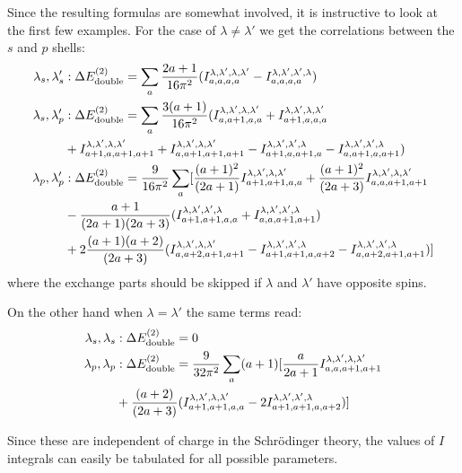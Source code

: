 Since the resulting formulas are somewhat involved, it is instructive to look at the first few examples. For the case of $\lambda\neq\lambda'$ we get the correlations between the $s$ and $p$ shells:
\begin{align}
    \lambda_s,\lambda'_s &: \Delta E^{(2)}_{\rm{double}}= \sum_a \frac{2a+1}{16 \pi^2} (I^{\lambda,\lambda',\lambda,\lambda'}_{a,a,a,a} - I^{\lambda,\lambda',\lambda',\lambda}_{a,a,a,a}) \\
    \lambda_s,\lambda'_p &:\Delta E^{(2)}_{\rm{double}}= \sum_a \frac{3(a+1)}{16 \pi^2} (I^{\lambda,\lambda',\lambda,\lambda'}_{a,a+1,a,a}+I^{\lambda,\lambda',\lambda,\lambda'}_{a+1,a,a,a} \\
    &+ I^{\lambda,\lambda',\lambda,\lambda'}_{a+1,a,a+1,a+1}+I^{\lambda,\lambda',\lambda,\lambda'}_{a,a+1,a+1,a+1}-I^{\lambda,\lambda',\lambda',\lambda}_{a+1,a,a+1,a}-I^{\lambda,\lambda',\lambda',\lambda}_{a,a+1,a,a+1}) \\
  \lambda_p,\lambda'_p &:\Delta E^{(2)}_{\rm{double}}= \frac{9}{16\pi^2}\sum_a [\frac{(a+1)^2}{(2a+1)}I^{\lambda,\lambda',\lambda,\lambda'}_{a+1,a+1,a,a} +\frac{(a+1)^2}{(2a+3)}I^{\lambda,\lambda',\lambda,\lambda'}_{a,a,a+1,a+1} \\
  &-\frac{a+1}{(2a+1)(2a+3)}(I^{\lambda,\lambda',\lambda',\lambda}_{a+1,a+1,a,a} +I^{\lambda,\lambda',\lambda',\lambda}_{a,a,a+1,a+1}) \\
 &+2 \frac{(a+1)(a+2)}{(2a+3)}(I^{\lambda,\lambda',\lambda,\lambda'}_{a,a+2,a+1,a+1}-I^{\lambda,\lambda',\lambda',\lambda}_{a+1,a+1,a,a+2} -I^{\lambda,\lambda',\lambda',\lambda}_{a,a+2,a+1,a+1})]
\end{align}
where the exchange parts should be skipped if $\lambda$ and $\lambda'$ have opposite spins.

On the other hand when $\lambda=\lambda'$ the same terms read:
\begin{align}
    \lambda_s,\lambda_s &: \Delta E^{(2)}_{\rm{double}}= 0 \\
  \lambda_p,\lambda_p &: \Delta E^{(2)}_{\rm{double}}= \frac{9}{32\pi^2}\sum_a (a+1)[\frac{a}{2a+1}I^{\lambda,\lambda',\lambda,\lambda'}_{a,a,a+1,a+1}\nonumber
  \\
  &+\frac{(a+2)}{(2a+3)}(I^{\lambda,\lambda',\lambda,\lambda'}_{a+1,a+1,a,a}-2I^{\lambda,\lambda',\lambda',\lambda}_{a+1,a+1,a,a+2})]
\end{align}


Since these are independent of charge in the Schr\"odinger theory, the values of $I$ integrals can easily be tabulated for all possible parameters. %